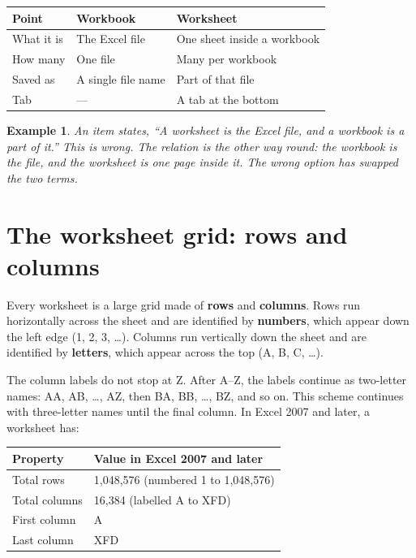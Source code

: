 \documentclass[11pt]{article}
\newtheorem{example}{Example}[section]
\begin{document}
\begin{center}
\begin{tabular}{p{}p{}p{}}
\toprule
\textbf{Point} & \textbf{Workbook} & \textbf{Worksheet} \\
\midrule
What it is & The Excel file & One sheet inside a workbook \\
How many & One file & Many per workbook \\
Saved as & A single file name & Part of that file \\
Tab & --- & A tab at the bottom \\
\bottomrule
\end{tabular}
\end{center}

\begin{example}
An item states, ``A worksheet is the Excel file, and a workbook is a part of
it.'' This is wrong. The relation is the other way round: the workbook is
the file, and the worksheet is one page inside it. The wrong option has
swapped the two terms.
\end{example}

\section{The worksheet grid: rows and columns}
Every worksheet is a large grid made of \textbf{rows} and \textbf{columns}.
Rows run horizontally across the sheet and are identified by
\textbf{numbers}, which appear down the left edge (1, 2, 3, \dots).
Columns run vertically down the sheet and are identified by
\textbf{letters}, which appear across the top (A, B, C, \dots).

The column labels do not stop at Z. After A--Z, the labels continue as
two-letter names: AA, AB, \dots, AZ, then BA, BB, \dots, BZ, and so on. This
scheme continues with three-letter names until the final column. In Excel
2007 and later, a worksheet has:

\begin{center}
\begin{tabular}{ll}
\toprule
\textbf{Property} & \textbf{Value in Excel 2007 and later} \\
\midrule
Total rows & 1,048,576 (numbered 1 to 1,048,576) \\
Total columns & 16,384 (labelled A to XFD) \\
First column & A \\
Last column & XFD \\
\bottomrule
\end{tabular}
\end{center}
\end{document}
